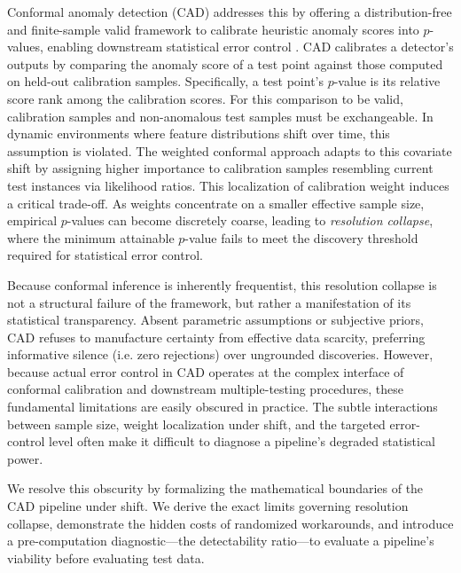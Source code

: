 Conformal anomaly detection (CAD) addresses this by offering a distribution-free and finite-sample valid framework to calibrate heuristic anomaly scores into $p$-values, enabling downstream statistical error control \cite{Bates2023}. CAD calibrates a detector's outputs by comparing the anomaly score of a test point against those computed on held-out calibration samples. Specifically, a test point's $p$-value is its relative score rank among the calibration scores. For this comparison to be valid, calibration samples and non-anomalous test samples must be exchangeable. In dynamic environments where feature distributions shift over time, this assumption is violated. The weighted conformal approach adapts to this covariate shift by assigning higher importance to calibration samples resembling current test instances via likelihood ratios. This localization of calibration weight induces a critical trade-off. As weights concentrate on a smaller effective sample size, empirical $p$-values can become discretely coarse, leading to \textit{resolution collapse}, where the minimum attainable $p$-value fails to meet the discovery threshold required for statistical error control.

Because conformal inference is inherently frequentist, this resolution collapse is not a structural failure of the framework, but rather a manifestation of its statistical transparency. Absent parametric assumptions or subjective priors, CAD refuses to manufacture certainty from effective data scarcity, preferring informative silence (i.e. zero rejections) over ungrounded discoveries. However, because actual error control in CAD operates at the complex interface of conformal calibration and downstream multiple-testing procedures, these fundamental limitations are easily obscured in practice. The subtle interactions between sample size, weight localization under shift, and the targeted error-control level often make it difficult to diagnose a pipeline's degraded statistical power.

We resolve this obscurity by formalizing the mathematical boundaries of the CAD pipeline under shift. We derive the exact limits governing resolution collapse, demonstrate the hidden costs of randomized workarounds, and introduce a pre-computation diagnostic—the detectability ratio—to evaluate a pipeline's viability before evaluating test data.


